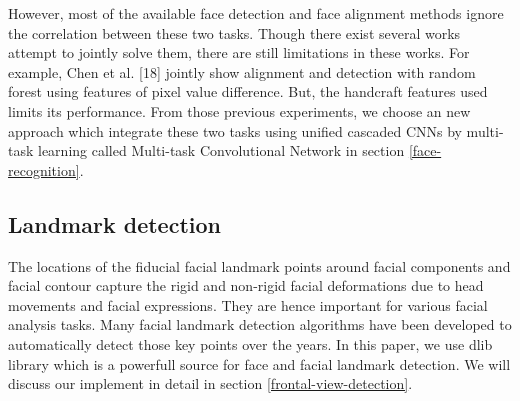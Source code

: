 \documentclass[journal, twocolumn]{IEEEtran}
\begin{document}
However, most of the available face detection and face alignment methods ignore the correlation between these two tasks. Though there exist several works attempt to jointly solve them, there are still limitations in these works. For example, Chen et al. [18] jointly show alignment and detection with random forest using features of pixel value difference. But, the handcraft features used limits its performance. From those previous experiments, we choose an new approach which integrate these two tasks using unified cascaded CNNs by multi-task learning called Multi-task Convolutional Network in section \ref{face-recognition}.
\subsection{Landmark detection}
The locations of the fiducial facial landmark points around facial components and facial contour capture  the  rigid  and  non-rigid  facial  deformations  due to  head  movements  and  facial  expressions.  They  are hence important for various facial analysis tasks. Many facial landmark detection algorithms have been developed to automatically detect those key points over the years. In this paper, we use dlib library which is a powerfull source for face and facial landmark detection. We will discuss our implement in detail in section \ref{frontal-view-detection}.
\end{document}
